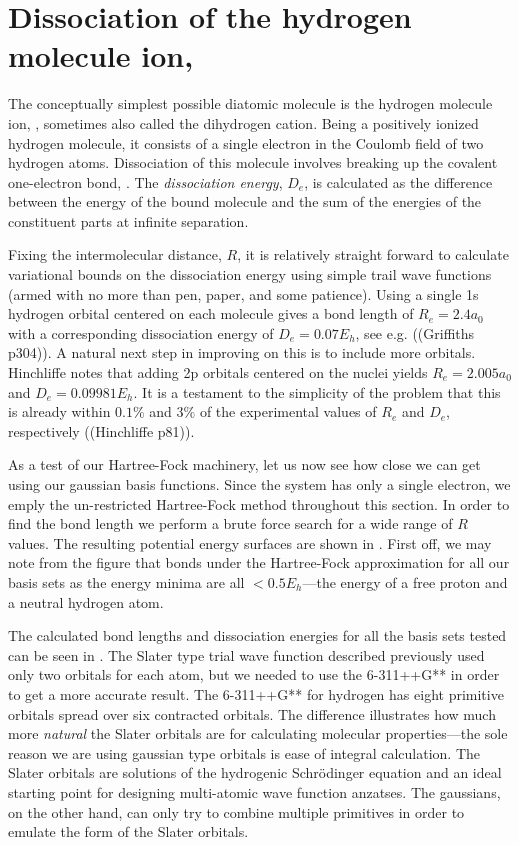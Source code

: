 \documentclass[../../master.tex]{subfiles}
\begin{document}
\section{Dissociation of the hydrogen molecule ion, \texorpdfstring{}{H2+}}
The conceptually simplest possible diatomic molecule is the hydrogen molecule ion, , sometimes also called the dihydrogen cation. Being a positively ionized hydrogen molecule, it consists of a single electron in the Coulomb field of two hydrogen atoms. Dissociation of this molecule involves breaking up the covalent one-electron bond, . The \emph{dissociation energy}, $D_e$, is calculated as the difference between the energy of the bound molecule and the sum of the energies of the constituent parts at infinite separation.

Fixing the intermolecular distance, $R$, it is relatively straight forward to calculate variational bounds on the dissociation energy using simple trail wave functions (armed with no more than pen, paper, and some patience). Using a single 1s hydrogen orbital centered on each molecule gives a bond length of $R_e=2.4a_0$ with a corresponding dissociation energy of $D_e=0.07E_h$, see e.g. ((Griffiths p304)). A natural next step in improving on this is to include more orbitals. Hinchliffe notes that adding 2p orbitals centered on the nuclei yields $R_e=2.005a_0$ and $D_e=0.09981E_h$. It is a testament to the simplicity of the problem that this is already within $0.1\%$ and $3\%$ of the experimental values of $R_e$ and $D_e$, respectively ((Hinchliffe p81)).

As a test of our Hartree-Fock machinery, let us now see how close we can get using our gaussian basis functions. Since the system has only a single electron, we emply the un-restricted Hartree-Fock method throughout this section. In order to find the bond length we perform a brute force search for a wide range of $R$ values. The resulting potential energy surfaces are shown in . First off, we may note from the figure that  bonds under the Hartree-Fock approximation for all our basis sets as the energy minima are all $<0.5E_h$\----the energy of a free proton and a neutral hydrogen atom.

The calculated bond lengths and dissociation energies for all the basis sets tested can be seen in . The Slater type trial wave function described previously used only two orbitals for each atom, but we needed to use the 6-311++G** in order to get a more accurate result. The 6-311++G** for hydrogen has eight primitive orbitals spread over six contracted orbitals. The difference illustrates how much more \emph{natural} the Slater orbitals are for calculating molecular properties\----the sole reason we are using gaussian type orbitals is ease of integral calculation. The Slater orbitals are solutions of the hydrogenic Schrödinger equation and an ideal starting point for designing multi-atomic wave function anzatses. The gaussians, on the other hand, can only try to combine multiple primitives in order to emulate the form of the Slater orbitals.
\end{document}
